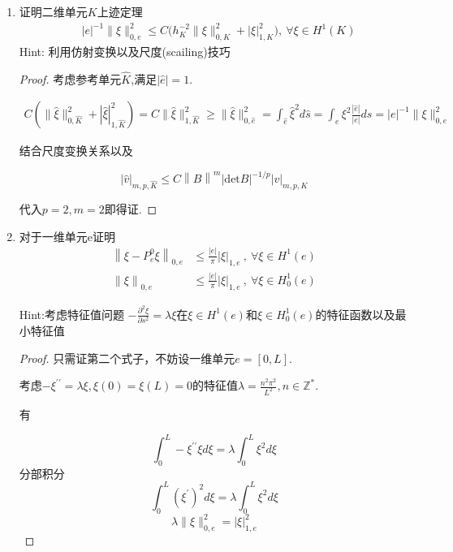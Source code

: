 \documentclass[12pt,a4paper]{article}
\begin{document}
	\begin{enumerate}
		\item 证明二维单元$K$上迹定理
		$$\begin{aligned}&|e|^{-1}\|\xi\|_{0,e}^{2}\leq C\Big(h_{K}^{-2}\|\xi\|_{0,K}^{2}+|\xi|_{1,K}^{2}\Big),\:\forall\xi\in H^{1}(K)\end{aligned}$$
		Hint: 利用仿射变换以及尺度(scailing)技巧
		
		\begin{proof}
			考虑参考单元$\hat{K}$,满足$|\hat{e}|=1$.
			
			\begin{equation*}
				\begin{aligned}
					C(\|\hat{\xi}\|_{0,\hat{K}}^{2}+|\hat{\xi}|_{1,\hat{K}}^{2}) = C\|\hat{\xi}\|_{1,\hat{K}}^2 \geq \|\hat{\xi}\|^2_{0,\hat{e}} = \int_{\hat{e}} \hat{\xi}^2 d\hat{s} = \int_{e}  \xi^2 \frac{|\hat{e}|}{|e|} ds = |e|^{-1}\|\xi\|_{0,e}^{2} 
				\end{aligned}
			\end{equation*}
			
			结合尺度变换关系以及
			
			$$
			|\hat{v}|_{m,p,\hat{K}}\leq C\left\|B\right\|^m|\mathrm{det}B|^{-1/p}|v|_{m,p,K}
			$$
			
			代入$p = 2, m= 2$即得证.
			
		\end{proof}
		
		\item 对于一维单元e证明
		$$\begin{aligned}\left\|\xi-P_{e}^{0}\xi\right\|_{0,e}&\leq\frac{|e|}\pi|\xi|_{1,e}\:,\:\forall\xi\in H^1(e)\\\left\|\xi\right\|_{0,e}&\leq\frac{|e|}\pi|\xi|_{1,e}\:,\:\forall\xi\in H_0^1(e)\end{aligned}$$
		
		Hint:考虑特征值问题 $-\frac{\partial^2 \xi}{\partial s^2} = \lambda \xi$在$\xi \in H^1(e)$和$\xi \in H_0^1(e)$的特征函数以及最小特征值
		
		\begin{proof}
			
			只需证第二个式子，不妨设一维单元$e = [0,L]$.
			
			考虑$-\xi ^{\prime\prime} = \lambda \xi, \xi(0) = \xi(L) = 0$的特征值$\lambda = \displaystyle \frac{n^2 \pi^2}{L^2} , n \in \mathbb{Z^*}$.
			
			有
			
			$$\int_0^L - \xi^{\prime\prime} \xi d\xi =\lambda \int_0^L \xi^2 d\xi$$
			分部积分
			$$\int_0^L (\xi^{\prime})^2 d\xi  =\lambda \int_0^L \xi^2 d\xi  $$
			$$\lambda \|\xi\|_{0,e}^2 = |\xi|_{1,e}^2$$
			

\end{proof}
\end{enumerate}
\end{document}
